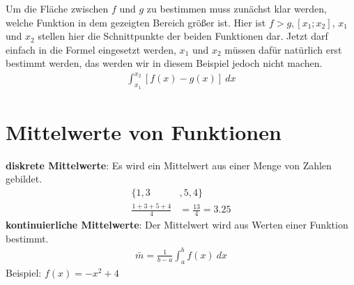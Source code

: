 \begin{flushleft}
    Um die Fläche zwischen $f$ und $g$ zu bestimmen muss zunächst klar werden, welche Funktion in dem gezeigten Bereich größer ist.
    Hier ist $f > g, [x_1;x_2]$, $x_1$ und $x_2$ stellen hier die Schnittpunkte der beiden Funktionen dar.
    Jetzt darf einfach in die Formel eingesetzt werden, $x_1$ und $x_2$ müssen dafür natürlich erst bestimmt werden, das werden wir in diesem Beispiel jedoch nicht machen.
    \begin{align}
        \int_{x_1}^{x_2} \left[f(x)-g(x)\right] \ dx
    \end{align}
\end{flushleft}

\section{Mittelwerte von Funktionen}

\begin{flushleft}
    \textbf{diskrete Mittelwerte}: \newline
    Es wird ein Mittelwert aus einer Menge von Zahlen gebildet. \newline
    \begin{align}
        \{1,3&,5,4\} \\
        \frac{1+3+5+4}{4}&=\frac{13}{4}=3.25
    \end{align}
    \newline
    \textbf{kontinuierliche Mittelwerte}: \newline
    Der Mittelwert wird aus Werten einer Funktion bestimmt. \newline
    \begin{align}
        \bar{m}=\frac{1}{b-a}\int_{a}^{b} f(x) \ dx
    \end{align}
    Beispiel: $f(x)=-x^2+4$
\end{flushleft}

\begin{center}
\end{center}

